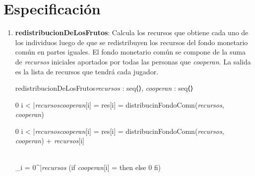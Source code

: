 \documentclass[10pt,a4paper]{article}
\begin{document}
\section{Especificación} 

\begin{enumerate}
    \item \textbf{redistribucionDeLosFrutos}: Calcula los recursos que obtiene cada uno de los individuos luego de que se redistribuyen
    los recursos del fondo monetario común en partes iguales. El fondo monetario común se compone de la suma de \textit{recursos} iniciales aportados por todas las personas que \textit{cooperan}. La salida es la lista de recursos que tendrá cada jugador.

    \begin{proc}{redistribucionDeLosFrutos}{\In \textit{recursos} : seq⟨\real⟩, \In \textit{cooperan} : }
    {seq⟨\real⟩}



    \end{proc}
    

    {
    {0 \leq i < |{\textit{recursos}}\vert \y  \textit{cooperan}[i] = \True \implicaLuego res[i] = 
    distribucinFondoComn(\textit{recursos}, \textit{cooperan})}}
    
    {
    {0 \leq i < |{\textit{recursos}}\vert \y  \textit{cooperan}[i] = \False \implicaLuego res[i] = 
    distribucinFondoComn(\textit{recursos}, \textit{cooperan}) + \textit{recursos}[i]}}

    {\\\sum_{i = 0}^{|{\textit{recursos}}} 
    (if \hspace{2mm} \textit{cooperan}[i] = \True \hspace{2mm} then \hspace{2mm}  \hspace{2mm} else \hspace{2mm} 0 \hspace{2mm} fi)}
    

\end{enumerate}
\end{document}
